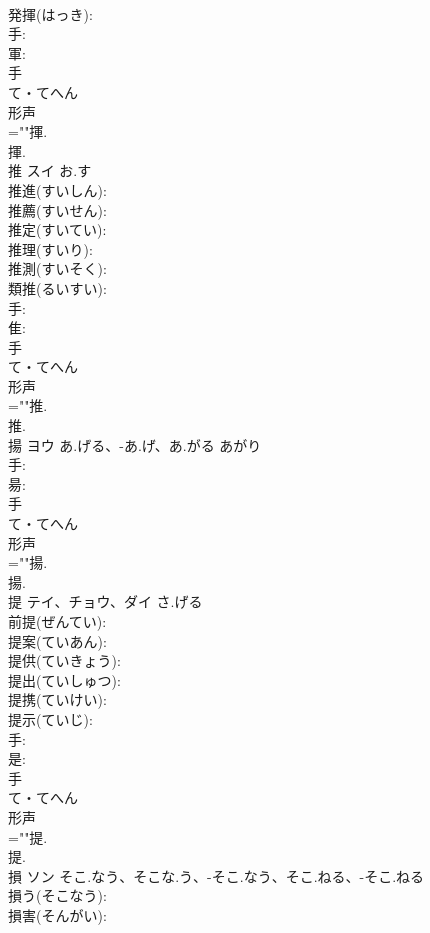 \documentclass[8pt]{extreport}
\begin{document}
\begin{CJK}{UTF8}{min}
\\	発揮(はっき): 
\\	手: 
\\	軍: 
\\	手	
\\	て・てへん	
\\	形声 
\\	=""揮.
\\	揮.
\\	推	スイ	お.す		
\\	推進(すいしん): 
\\	推薦(すいせん): 
\\	推定(すいてい): 
\\	推理(すいり): 
\\	推測(すいそく): 
\\	類推(るいすい): 
\\	手: 
\\	隹: 
\\	手	
\\	て・てへん	
\\	形声 
\\	=""推.
\\	推.
\\	揚	ヨウ	あ.げる、-あ.げ、あ.がる	あがり	
\\	手: 
\\	昜: 
\\	手	
\\	て・てへん	
\\	形声 
\\	=""揚.
\\	揚.
\\	提	テイ、チョウ、ダイ	さ.げる		
\\	前提(ぜんてい): 
\\	提案(ていあん): 
\\	提供(ていきょう): 
\\	提出(ていしゅつ): 
\\	提携(ていけい): 
\\	提示(ていじ): 
\\	手: 
\\	是: 
\\	手	
\\	て・てへん	
\\	形声 
\\	=""提.
\\	提.
\\	損	ソン	そこ.なう、そこな.う、-そこ.なう、そこ.ねる、-そこ.ねる		
\\	損う(そこなう): 
\\	損害(そんがい): 

\end{CJK}
\end{document}
